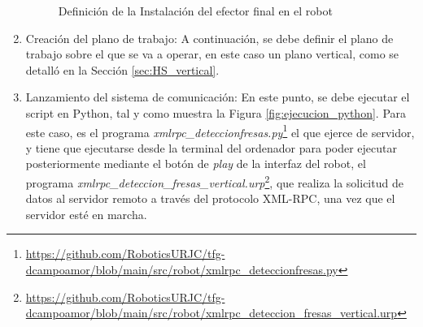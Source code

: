 \begin{enumerate}
    \begin{figure}[H]
      \begin{center}
        \subcapcentertrue
        \hspace{4mm}
      \end{center}
      \caption{Definición de la Instalación del efector final en el robot}
      \label{fig:Config_UR}
    \end{figure}
  
  \item Creación del plano de trabajo: A continuación, se debe definir el plano de trabajo sobre el que se va a operar, en este caso un plano vertical, como se detalló en la Sección \ref{sec:HS_vertical}. 
  
  \item Lanzamiento del sistema de comunicación: En este punto, se debe ejecutar el script en Python, tal y como muestra la Figura \ref{fig:ejecucion_python}. Para este caso, es el programa \textit{xmlrpc\_deteccionfresas.py}\footnote{\url{https://github.com/RoboticsURJC/tfg-dcampoamor/blob/main/src/robot/xmlrpc_deteccionfresas.py}} el que ejerce de servidor, y tiene que ejecutarse desde la terminal del ordenador para poder ejecutar posteriormente mediante el botón de \textit{play} de la interfaz del robot, el programa \textit{xmlrpc\_deteccion\_fresas\_vertical.urp}\footnote{\url{https://github.com/RoboticsURJC/tfg-dcampoamor/blob/main/src/robot/xmlrpc_deteccion_fresas_vertical.urp}}, que realiza la solicitud de datos al servidor remoto a través del protocolo XML-RPC, una vez que el servidor esté en marcha.
  

\end{enumerate}
